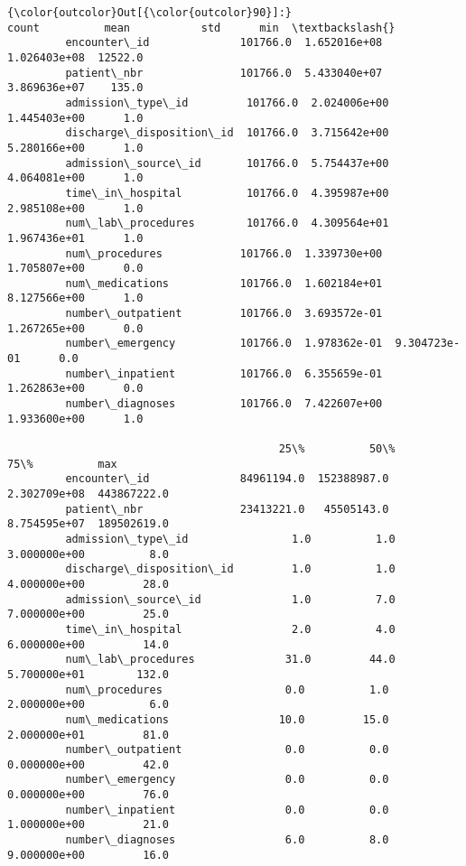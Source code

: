 \documentclass[11pt]{article}
\begin{document}
\begin{Verbatim}[commandchars=\\\{\}]
{\color{outcolor}Out[{\color{outcolor}90}]:}                              count          mean           std      min  \textbackslash{}
         encounter\_id              101766.0  1.652016e+08  1.026403e+08  12522.0   
         patient\_nbr               101766.0  5.433040e+07  3.869636e+07    135.0   
         admission\_type\_id         101766.0  2.024006e+00  1.445403e+00      1.0   
         discharge\_disposition\_id  101766.0  3.715642e+00  5.280166e+00      1.0   
         admission\_source\_id       101766.0  5.754437e+00  4.064081e+00      1.0   
         time\_in\_hospital          101766.0  4.395987e+00  2.985108e+00      1.0   
         num\_lab\_procedures        101766.0  4.309564e+01  1.967436e+01      1.0   
         num\_procedures            101766.0  1.339730e+00  1.705807e+00      0.0   
         num\_medications           101766.0  1.602184e+01  8.127566e+00      1.0   
         number\_outpatient         101766.0  3.693572e-01  1.267265e+00      0.0   
         number\_emergency          101766.0  1.978362e-01  9.304723e-01      0.0   
         number\_inpatient          101766.0  6.355659e-01  1.262863e+00      0.0   
         number\_diagnoses          101766.0  7.422607e+00  1.933600e+00      1.0   
         
                                          25\%          50\%           75\%          max  
         encounter\_id              84961194.0  152388987.0  2.302709e+08  443867222.0  
         patient\_nbr               23413221.0   45505143.0  8.754595e+07  189502619.0  
         admission\_type\_id                1.0          1.0  3.000000e+00          8.0  
         discharge\_disposition\_id         1.0          1.0  4.000000e+00         28.0  
         admission\_source\_id              1.0          7.0  7.000000e+00         25.0  
         time\_in\_hospital                 2.0          4.0  6.000000e+00         14.0  
         num\_lab\_procedures              31.0         44.0  5.700000e+01        132.0  
         num\_procedures                   0.0          1.0  2.000000e+00          6.0  
         num\_medications                 10.0         15.0  2.000000e+01         81.0  
         number\_outpatient                0.0          0.0  0.000000e+00         42.0  
         number\_emergency                 0.0          0.0  0.000000e+00         76.0  
         number\_inpatient                 0.0          0.0  1.000000e+00         21.0  
         number\_diagnoses                 6.0          8.0  9.000000e+00         16.0  
\end{Verbatim}
            
\end{document}
